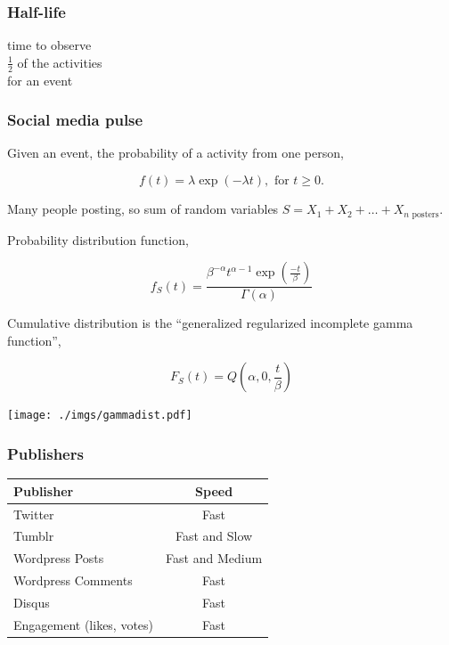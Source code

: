 \documentclass{beamer}
\begin{document}

\begin{frame}\frametitle{Half-life}
\begin{center}
{\Huge time to observe \\[6pt] $\frac{1}{2}$ of the activities \\[6pt] for an event}
\end{center}
\end{frame}

\begin{frame}
\frametitle{Social media pulse} 
Given an event, the probability of a activity from one person,

\begin{equation*}
f(t) = \lambda \exp(-\lambda t), \text{ for } t \geq 0.
\end{equation*}

Many people posting, so sum of random variables $S = X_1 + X_2 + \ldots + X_{n \text{ posters}}$.

Probability distribution function,

\begin{equation*}
f_S(t) = \frac{ \beta^{-\alpha} t^{\alpha-1} \exp( \frac{-t}{\beta}) } {\Gamma(\alpha)}
\end{equation*}

Cumulative distribution is the ``generalized regularized incomplete gamma function'',

\begin{equation*}
F_S(t) = Q(\alpha, 0, \frac{ t}{\beta})
\end{equation*}
\end{frame}


\begin{frame}
  \begin{center}
   \texttt{[image: ./imgs/gammadist.pdf]}
  \end{center}
\end{frame}

\begin{frame} \frametitle{Publishers}
\begin{table}
\begin{tabular}{l|c}
\hline
   {Publisher}   &   {Speed} \\
\hline 
    Twitter      &    Fast  \\ 
    Tumblr      &        Fast and Slow \\
    Wordpress Posts &   Fast and Medium   \\
    Wordpress Comments & Fast\\
    Disqus       &    Fast\\
    Engagement (likes, votes) &  Fast\\
\hline
\end{tabular}
\end{table}
\end{frame}
\end{document}
